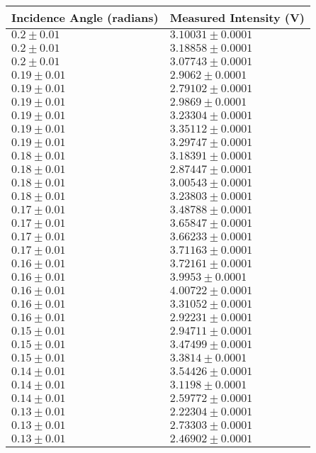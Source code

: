 \begin{tabular}{| p{} | p{} |}
\hline
Incidence Angle (radians) & Measured Intensity (V)\\
\hline
$0.2 \pm 0.01$ & $3.10031 \pm 0.0001$\\
$0.2 \pm 0.01$ & $3.18858 \pm 0.0001$\\
$0.2 \pm 0.01$ & $3.07743 \pm 0.0001$\\
$0.19 \pm 0.01$ & $2.9062 \pm 0.0001$\\
$0.19 \pm 0.01$ & $2.79102 \pm 0.0001$\\
$0.19 \pm 0.01$ & $2.9869 \pm 0.0001$\\
$0.19 \pm 0.01$ & $3.23304 \pm 0.0001$\\
$0.19 \pm 0.01$ & $3.35112 \pm 0.0001$\\
$0.19 \pm 0.01$ & $3.29747 \pm 0.0001$\\
$0.18 \pm 0.01$ & $3.18391 \pm 0.0001$\\
$0.18 \pm 0.01$ & $2.87447 \pm 0.0001$\\
$0.18 \pm 0.01$ & $3.00543 \pm 0.0001$\\
$0.18 \pm 0.01$ & $3.23803 \pm 0.0001$\\
$0.17 \pm 0.01$ & $3.48788 \pm 0.0001$\\
$0.17 \pm 0.01$ & $3.65847 \pm 0.0001$\\
$0.17 \pm 0.01$ & $3.66233 \pm 0.0001$\\
$0.17 \pm 0.01$ & $3.71163 \pm 0.0001$\\
$0.16 \pm 0.01$ & $3.72161 \pm 0.0001$\\
$0.16 \pm 0.01$ & $3.9953 \pm 0.0001$\\
$0.16 \pm 0.01$ & $4.00722 \pm 0.0001$\\
$0.16 \pm 0.01$ & $3.31052 \pm 0.0001$\\
$0.16 \pm 0.01$ & $2.92231 \pm 0.0001$\\
$0.15 \pm 0.01$ & $2.94711 \pm 0.0001$\\
$0.15 \pm 0.01$ & $3.47499 \pm 0.0001$\\
$0.15 \pm 0.01$ & $3.3814 \pm 0.0001$\\
$0.14 \pm 0.01$ & $3.54426 \pm 0.0001$\\
$0.14 \pm 0.01$ & $3.1198 \pm 0.0001$\\
$0.14 \pm 0.01$ & $2.59772 \pm 0.0001$\\
$0.13 \pm 0.01$ & $2.22304 \pm 0.0001$\\
$0.13 \pm 0.01$ & $2.73303 \pm 0.0001$\\
$0.13 \pm 0.01$ & $2.46902 \pm 0.0001$\\
\hline
\end{tabular}\hfill
